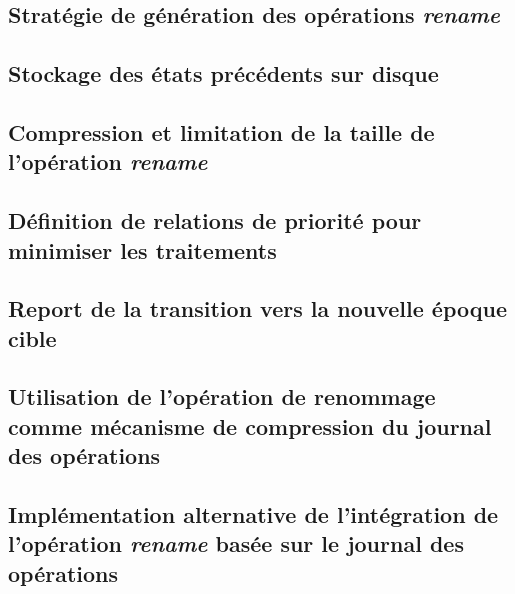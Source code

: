 
\subsection{Stratégie de génération des opérations \emph{rename}}


\subsection{Stockage des états précédents sur disque}
\label{sec:offloading-former-states}


\subsection{Compression et limitation de la taille de l'opération \emph{rename}}
\label{sec:compression-rename}


\subsection{Définition de relations de priorité pour minimiser les traitements}
\label{sec:alt-priority-relation}


\subsection{Report de la transition vers la nouvelle époque cible}
\label{sec:report-transition-to-target-epoch}


\subsection{Utilisation de l'opération de renommage comme mécanisme de compression du journal des opérations}
\label{sec:rename-as-compression-mechanism}


\subsection{Implémentation alternative de l'intégration de l'opération \emph{rename} basée sur le journal des opérations}
\label{sec:log-based-rename-mechanism}


